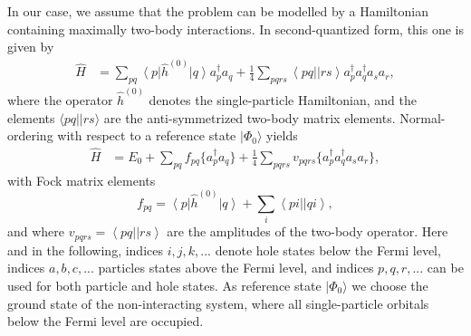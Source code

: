 \documentclass[amsmath, amssymb, aps, floatfix, nofootinbib, preprintnumbers,showpacs, superscriptaddress, twocolumn]{revtex4-1}
\newcommand{\da}{^\dagger}
\newcommand{\lla}{\left\langle}
\newcommand{\rra}{\right\rangle}
\newcommand{\llb}{\lbrace}
\newcommand{\rrb}{\rbrace}
\begin{document}
In our case, we assume that the problem can be modelled by a
Hamiltonian containing maximally two-body interactions. In
second-quantized form, this one is given by
\begin{align}
\hat{H} & = \sum\limits_{pq}\left\langle p \right| \hat{h}^{(0)}
\left| q \right\rangle a_p\da a_q + \frac{1}{4}\sum\limits_{pqrs}\lla
pq || r s \rra a_p\da a_q\da a_s a_r,
\label{eq:ourHamiltonian}
\end{align}
where the operator $\hat{h}^{(0)}$ denotes the single-particle
Hamiltonian, and the elements $\langle pq||rs\rangle$ are the
anti-symmetrized two-body matrix elements.  Normal-ordering with
respect to a reference state $|\Phi_0\rangle$ yields
\begin{align*}
\hat{H} &= E_0 + \sum\limits_{pq}f_{pq}\llb a_p\da a_q\rrb +
\frac{1}{4}\sum\limits_{pqrs}v_{pqrs} \llb a_p\da a_q\da a_s a_r \rrb,
\end{align*}
with Fock matrix elements
\[
f_{pq} = \lla p \right|\hat{h}^{(0)}\left| q \rra + \sum\limits_{i}
\lla pi || qi\rra,
\]
and where $v_{pqrs} = \lla pq || r s \rra$ are the amplitudes of the
two-body operator.  Here and in the following, indices $i,j,k,...$
denote hole states below the Fermi level, indices $a,b,c,...$
particles states above the Fermi level, and indices $ p,q,r,...$ can
be used for both particle and hole states. As reference state
$|\Phi_0\rangle$ we choose the ground state of the non-interacting
system, where all single-particle orbitals below the Fermi level are
occupied.
\end{document}

